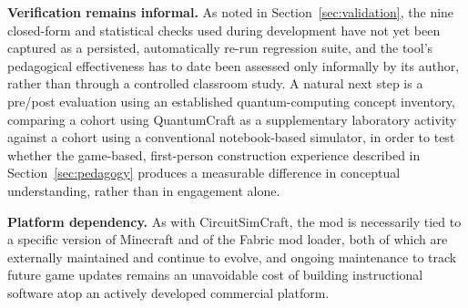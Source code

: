 \textbf{Verification remains informal.} As noted in Section~\ref{sec:validation}, the nine
closed-form and statistical checks used during development have not yet been captured as a
persisted, automatically re-run regression suite, and the tool's pedagogical effectiveness
has to date been assessed only informally by its author, rather than through a controlled
classroom study. A natural next step is a pre/post evaluation using an established
quantum-computing concept inventory, comparing a cohort using QuantumCraft as a supplementary
laboratory activity against a cohort using a conventional notebook-based simulator, in order
to test whether the game-based, first-person construction experience described in
Section~\ref{sec:pedagogy} produces a measurable difference in conceptual understanding,
rather than in engagement alone.

\textbf{Platform dependency.} As with CircuitSimCraft, the mod is necessarily tied to a specific
version of Minecraft and of the Fabric mod loader, both of which are externally maintained and
continue to evolve, and ongoing maintenance to track future game updates remains an
unavoidable cost of building instructional software atop an actively developed commercial
platform.
